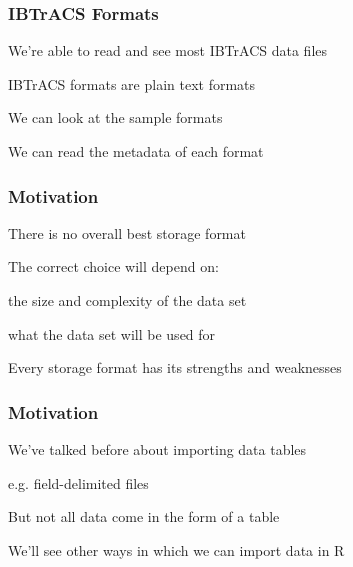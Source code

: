 \documentclass[12pt]{beamer}\usepackage[]{graphicx}\usepackage[]{color}
\begin{document}

\begin{frame}
\frametitle{IBTrACS Formats}

\bbi
  \item We're able to read and see most IBTrACS data files 
  \item IBTrACS formats are plain text formats
  \item We can look at the sample formats
  \item We can read the metadata of each format
\ei

\end{frame}


\begin{frame}
\frametitle{Motivation}

\bbi
  \item There is no overall best storage format
  \item The correct choice will depend on:
  \bi
    \item the size and complexity of the data set 
    \item what the data set will be used for
  \ei
  \item Every storage format has its strengths and weaknesses
\ei
\eb

\end{frame}


\begin{frame}
\begin{center}
\Huge{}
\end{center}
\end{frame}


\begin{frame}
\frametitle{Motivation}

\bi
  \item We've talked before about importing data tables
  \item e.g. field-delimited files
  \item But not all data come in the form of a table
  \item We'll see other ways in which we can import data in R
\ei

\end{frame}
\end{document}
